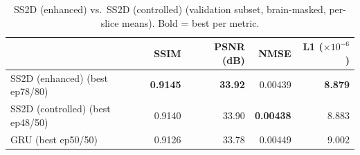 \begin{table}[ht]
\centering
\caption{SS2D (enhanced) vs.\ SS2D (controlled) (validation subset, brain-masked, per-slice means). Bold = best per metric.}
\label{tab:enhanced}
\begin{tabular}{lrrrr}
\toprule
 & SSIM & PSNR (dB) & NMSE & L1 ($\times 10^{-6}$) \\
\midrule
SS2D (enhanced) (best ep78/80) & \textbf{0.9145} & \textbf{33.92} & 0.00439 & \textbf{8.879} \\
SS2D (controlled) (best ep48/50) & 0.9140 & 33.90 & \textbf{0.00438} & 8.883 \\
GRU (best ep50/50) & 0.9126 & 33.78 & 0.00449 & 9.002 \\
\bottomrule
\end{tabular}
\end{table}
